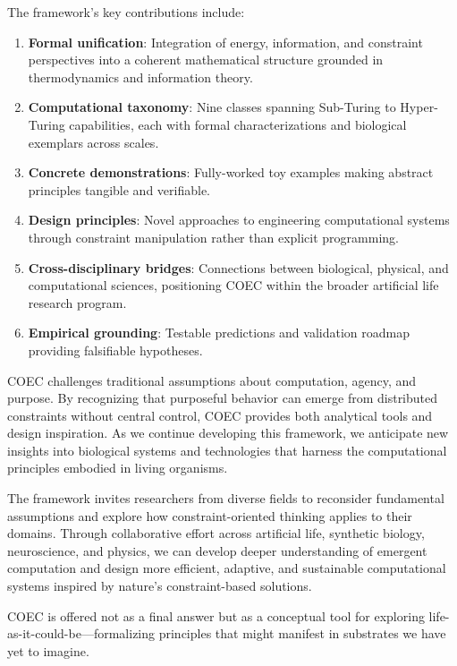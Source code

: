 \documentclass[11pt]{article}
\begin{document}
The framework's key contributions include:

\begin{enumerate}
\item \textbf{Formal unification}: Integration of energy, information, and constraint perspectives into a coherent mathematical structure grounded in thermodynamics and information theory.

\item \textbf{Computational taxonomy}: Nine classes spanning Sub-Turing to Hyper-Turing capabilities, each with formal characterizations and biological exemplars across scales.

\item \textbf{Concrete demonstrations}: Fully-worked toy examples making abstract principles tangible and verifiable.

\item \textbf{Design principles}: Novel approaches to engineering computational systems through constraint manipulation rather than explicit programming.

\item \textbf{Cross-disciplinary bridges}: Connections between biological, physical, and computational sciences, positioning COEC within the broader artificial life research program.

\item \textbf{Empirical grounding}: Testable predictions and validation roadmap providing falsifiable hypotheses.
\end{enumerate}

COEC challenges traditional assumptions about computation, agency, and purpose. By recognizing that purposeful behavior can emerge from distributed constraints without central control, COEC provides both analytical tools and design inspiration. As we continue developing this framework, we anticipate new insights into biological systems and technologies that harness the computational principles embodied in living organisms.

The framework invites researchers from diverse fields to reconsider fundamental assumptions and explore how constraint-oriented thinking applies to their domains. Through collaborative effort across artificial life, synthetic biology, neuroscience, and physics, we can develop deeper understanding of emergent computation and design more efficient, adaptive, and sustainable computational systems inspired by nature's constraint-based solutions.

COEC is offered not as a final answer but as a conceptual tool for exploring life-as-it-could-be—formalizing principles that might manifest in substrates we have yet to imagine.
\end{document}
